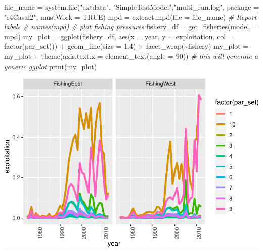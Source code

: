 \documentclass[
]{book}
\newenvironment{Shaded}{\begin{snugshade}}{\end{snugshade}}
\newcommand{\AttributeTok}[1]{\textcolor[rgb]{0.77,0.63,0.00}{#1}}
\newcommand{\CommentTok}[1]{\textcolor[rgb]{0.56,0.35,0.01}{\textit{#1}}}
\newcommand{\ConstantTok}[1]{\textcolor[rgb]{0.00,0.00,0.00}{#1}}
\newcommand{\DecValTok}[1]{\textcolor[rgb]{0.00,0.00,0.81}{#1}}
\newcommand{\FloatTok}[1]{\textcolor[rgb]{0.00,0.00,0.81}{#1}}
\newcommand{\FunctionTok}[1]{\textcolor[rgb]{0.00,0.00,0.00}{#1}}
\newcommand{\NormalTok}[1]{#1}
\newcommand{\OtherTok}[1]{\textcolor[rgb]{0.56,0.35,0.01}{#1}}
\newcommand{\SpecialCharTok}[1]{\textcolor[rgb]{0.00,0.00,0.00}{#1}}
\newcommand{\StringTok}[1]{\textcolor[rgb]{0.31,0.60,0.02}{#1}}
\begin{document}
\begin{Shaded}
\begin{Highlighting}[]
\NormalTok{file\_name }\OtherTok{=} \FunctionTok{system.file}\NormalTok{(}\StringTok{"extdata"}\NormalTok{, }\StringTok{"SimpleTestModel"}\NormalTok{,}\StringTok{"multi\_run.log"}\NormalTok{, }
                        \AttributeTok{package =} \StringTok{"r4Casal2"}\NormalTok{, }\AttributeTok{mustWork =} \ConstantTok{TRUE}\NormalTok{)}
\NormalTok{mpd }\OtherTok{=} \FunctionTok{extract.mpd}\NormalTok{(}\AttributeTok{file =}\NormalTok{ file\_name)}
\CommentTok{\# Report labels}
\CommentTok{\# names(mpd) }
\CommentTok{\# plot fishing pressures}
\NormalTok{fishery\_df }\OtherTok{=} \FunctionTok{get\_fisheries}\NormalTok{(}\AttributeTok{model =}\NormalTok{ mpd)}
\NormalTok{my\_plot }\OtherTok{=} \FunctionTok{ggplot}\NormalTok{(fishery\_df, }\FunctionTok{aes}\NormalTok{(}\AttributeTok{x =}\NormalTok{ year, }\AttributeTok{y =}\NormalTok{ exploitation, }\AttributeTok{col =} \FunctionTok{factor}\NormalTok{(par\_set))) }\SpecialCharTok{+}
  \FunctionTok{geom\_line}\NormalTok{(}\AttributeTok{size =} \FloatTok{1.4}\NormalTok{) }\SpecialCharTok{+}
  \FunctionTok{facet\_wrap}\NormalTok{(}\SpecialCharTok{\textasciitilde{}}\NormalTok{fishery)}
\NormalTok{my\_plot }\OtherTok{=}\NormalTok{ my\_plot }\SpecialCharTok{+} \FunctionTok{theme}\NormalTok{(}\AttributeTok{axis.text.x =} \FunctionTok{element\_text}\NormalTok{(}\AttributeTok{angle =} \DecValTok{90}\NormalTok{))}
\CommentTok{\# this will generate a generic ggplot}
\FunctionTok{print}\NormalTok{(my\_plot)}
\end{Highlighting}
\end{Shaded}

\includegraphics{_main_files/figure-latex/pressures_multi-1.pdf}
\end{document}
